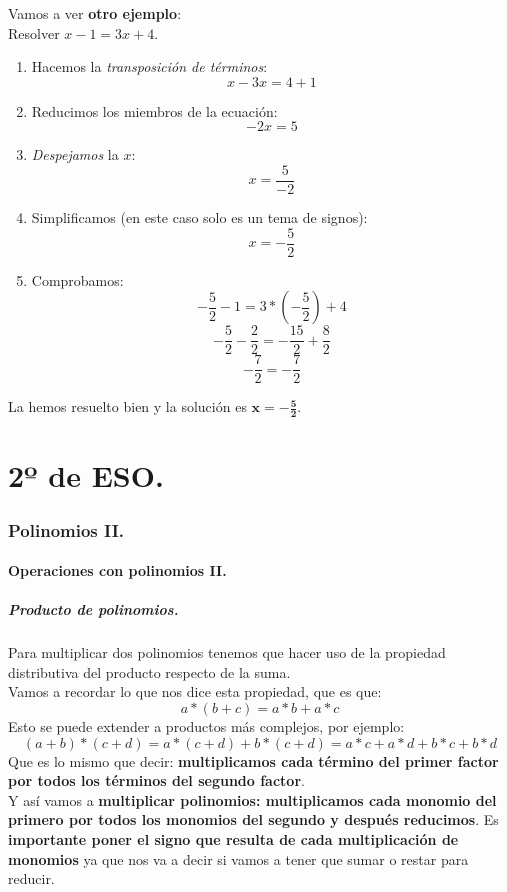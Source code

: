 \documentclass[a4paper,11pt,answers]{exam}
\begin{document}
  Vamos a ver \textbf{otro ejemplo}:\\

  Resolver $x - 1 = 3x + 4$.
  \begin{solution}
    \begin{enumerate}
    \item Hacemos la \emph{transposición de términos}:
      \[x - 3x = 4 + 1\]
    \item Reducimos los miembros de la ecuación:
      \[-2x = 5\]
    \item \emph{Despejamos} la $x$:
      \[x = \frac{5}{-2}\]
    \item Simplificamos (en este caso solo es un tema de signos):
      \[x = -\frac{5}{2}\]
    \item Comprobamos:
      \[-\frac{5}{2} - 1 = 3*\left(-\frac{5}{2}\right) + 4\]
      \[-\frac{5}{2} - \frac{2}{2} = -\frac{15}{2} + \frac{8}{2}\]
      \[-\frac{7}{2} = -\frac{7}{2}\]
    \end{enumerate}
    La hemos resuelto bien y la solución es $\boldsymbol{x = -\frac{5}{2}}$.
  \end{solution}
  \newpage
\part{2º de ESO.}
  \section{Polinomios II.}
  \subsection{Operaciones con polinomios II.}
  \subsubsection{Producto de polinomios.}
  Para multiplicar dos polinomios tenemos que hacer uso de la propiedad distributiva del producto respecto de la suma.\\
  Vamos a recordar lo que nos dice esta propiedad, que es que:
  \[a*(b+c) = a*b + a*c\]
  Esto se puede extender a productos más complejos, por ejemplo:
  \[(a+b)*(c+d) = a*(c+d)+b*(c+d) = a*c+a*d+b*c+b*d\]
  Que es lo mismo que decir: \textbf{multiplicamos cada término del primer factor por todos los términos del segundo factor}.\\

  Y así vamos a \textbf{multiplicar polinomios: multiplicamos cada monomio del primero por todos los monomios del segundo y después reducimos}. Es \textbf{importante poner el signo que resulta de cada multiplicación de monomios} ya que nos va a decir si vamos a tener que sumar o restar para reducir.\\
\end{document}
